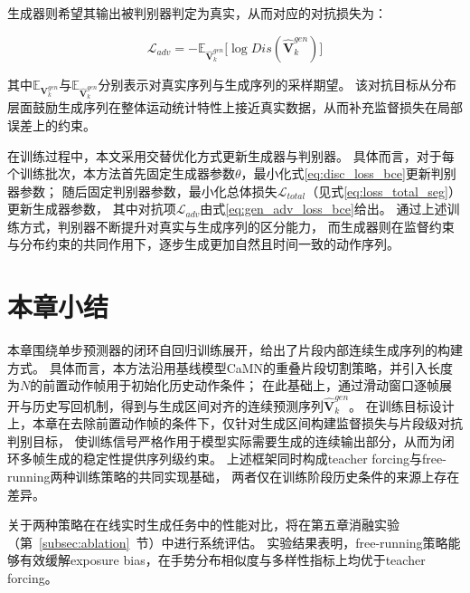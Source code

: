 生成器则希望其输出被判别器判定为真实，从而对应的对抗损失为：

\begin{equation}
\mathcal{L}_{adv} =
-\mathbb{E}_{\hat{\bm{V}}_k^{gen}}\big[\log Dis(\hat{\bm{V}}_k^{gen})\big]
\label{eq:gen_adv_loss_bce}
\end{equation}

其中$\mathbb{E}_{\bm{V}_k^{gen}}$与$\mathbb{E}_{\hat{\bm{V}}_k^{gen}}$分别表示对真实序列与生成序列的采样期望。
该对抗目标从分布层面鼓励生成序列在整体运动统计特性上接近真实数据，从而补充监督损失在局部误差上的约束。

在训练过程中，本文采用交替优化方式更新生成器与判别器。
具体而言，对于每个训练批次，本方法首先固定生成器参数$\theta$，最小化式\eqref{eq:disc_loss_bce}更新判别器参数；
随后固定判别器参数，最小化总体损失$\mathcal{L}_{total}$（见式\eqref{eq:loss_total_seg}）更新生成器参数，
其中对抗项$\mathcal{L}_{adv}$由式\eqref{eq:gen_adv_loss_bce}给出。
通过上述训练方式，判别器不断提升对真实与生成序列的区分能力，
而生成器则在监督约束与分布约束的共同作用下，逐步生成更加自然且时间一致的动作序列。

\section{本章小结}

本章围绕单步预测器的闭环自回归训练展开，给出了片段内部连续生成序列的构建方式。
具体而言，本方法沿用基线模型CaMN的重叠片段切割策略，并引入长度为$N$的前置动作帧用于初始化历史动作条件；
在此基础上，通过滑动窗口逐帧展开与历史写回机制，得到与生成区间对齐的连续预测序列$\hat{\bm{V}}_k^{gen}$。
在训练目标设计上，本章在去除前置动作帧的条件下，仅针对生成区间构建监督损失与片段级对抗判别目标，
使训练信号严格作用于模型实际需要生成的连续输出部分，从而为闭环多帧生成的稳定性提供序列级约束。
上述框架同时构成teacher forcing与free-running两种训练策略的共同实现基础，
两者仅在训练阶段历史条件的来源上存在差异。

关于两种策略在在线实时生成任务中的性能对比，将在第五章消融实验（第~\ref{subsec:ablation}~节）中进行系统评估。
实验结果表明，free-running策略能够有效缓解exposure bias，在手势分布相似度与多样性指标上均优于teacher forcing。